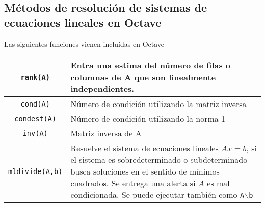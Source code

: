 \documentclass[letter,11pt]{article}
\newcommand{\octave}{{\sc Octave} }
\begin{document}
\subsection{M\'etodos de resoluci\'on de sistemas de ecuaciones lineales en \octave}

Las siguientes funciones vienen inclu\'idas en \octave

\begin{longtable}{||c|p{}||}
\hline
\texttt{rank(A)}	& 	Entra una estima del n\'umero de filas o columnas de A que son linealmente independientes.\\
\hline
\texttt{cond(A)}	&	N\'umero de condici\'on utilizando la matriz inversa \\
\hline
\texttt{condest(A)}	& 	N\'umero de condici\'on utilizando la norma 1\\
\hline
\texttt{inv(A)}		& 	Matriz inversa de A\\
\hline
\texttt{mldivide(A,b)} & Resuelve el sistema de ecuaciones lineales $Ax=b$, si el sistema es sobredeterminado o subdeterminado busca soluciones en el sentido de m\'inimos cuadrados. Se entrega una alerta si $A$ es mal condicionada. Se puede ejecutar tambi\'en como \texttt{A$\backslash$b}\\
\hline
\end{longtable}
\end{document}
